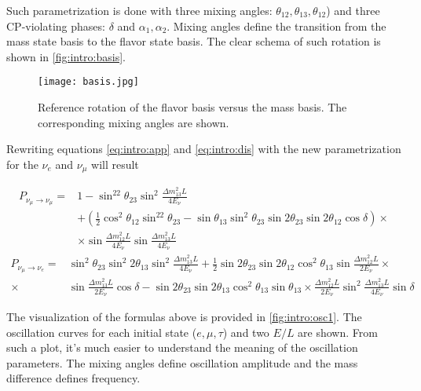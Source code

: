 \documentclass[../main.tex]{subfiles}
\begin{document}
Such parametrization is done with three mixing angles: $\theta_{12}, \theta_{13}, \theta_{12}$) and three CP-violating phases: $\delta$ and $\alpha_1, \alpha_2$. Mixing angles define the transition from the mass state basis to the flavor state basis. The clear schema of such rotation is shown in \autoref{fig:intro:basis}.

\begin{figure}[!ht]
  \centering
  \texttt{[image: basis.jpg]}
  \caption{Reference rotation of the flavor basis versus the mass basis. The corresponding mixing angles are shown.}
  \label{fig:intro:basis}
\end{figure}

Rewriting equations \autoref{eq:intro:app} and \autoref{eq:intro:dis} with the new parametrization for the $\nu_e$ and $\nu_\mu$ will result

\begin{equation}
\begin{split}
P_{\nu_\mu\to\nu_\mu}=&1-\sin^22\theta_{23}\sin^2\frac{\Delta m^2_{13}L}{4E_\nu} \\
&+\left(\frac{1}{2}\cos^2\theta_{12}\sin^22\theta_{23}-\sin\theta_{13}\sin^2\theta_{23}\sin2\theta_{23}\sin2\theta_{12}\cos\delta\right)\times \\
&\times\sin\frac{\Delta m^2_{12}L}{4E_\nu}\sin\frac{\Delta m^2_{13}L}{4E_\nu}
\end{split}
\label{eq:intro:disapp_p}
\end{equation}
\begin{equation}
\begin{split}
P_{\nu_\mu\to\nu_e}=&\sin^2\theta_{23}\sin^2 2\theta_{13}\sin^2\frac{\Delta m^2_{13}L}{4E_\nu}+\frac{1}{2}\sin2\theta_{23}\sin2\theta_{12}\cos^2\theta_{13}\sin\frac{\Delta m^2_{12}L}{2E_\nu} \times \\
\times & \sin\frac{\Delta m^2_{13}L}{2E_\nu}\cos\delta-\sin2\theta_{23}\sin2\theta_{13}\cos^2\theta_{13}\sin\theta_{13}\times\frac{\Delta m_{12}^2L}{2E_\nu}\sin^2\frac{\Delta m^2_{13}L}{4E_\nu}\sin\delta
\end{split}
\label{eq:intro:app_p}
\end{equation}

The visualization of the formulas above is provided in \autoref{fig:intro:osc1}. The oscillation curves for each initial state ($e, \mu, \tau$) and two $E/L$ are shown. From such a plot, it's much easier to understand the meaning of the oscillation parameters. The mixing angles define oscillation amplitude and the mass difference defines frequency.
\end{document}
